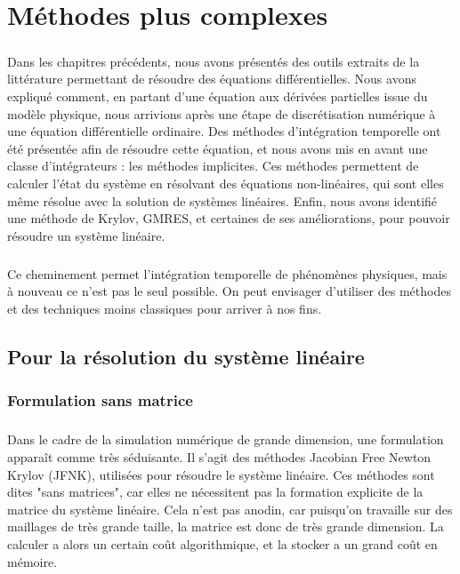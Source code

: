 \chapter{Méthodes plus complexes}

\paragraph{}
Dans les chapitres précédents, nous avons présentés des outils extraits de la littérature permettant de résoudre des équations différentielles.
Nous avons expliqué comment, en partant d'une équation aux dérivées partielles issue du modèle physique, nous arrivions après une étape de discrétisation numérique à une équation différentielle ordinaire.
Des méthodes d'intégration temporelle ont été présentée afin de résoudre cette équation, et nous avons mis en avant une classe d'intégrateurs : les méthodes implicites.
Ces méthodes permettent de calculer l'état du système en résolvant des équations non-linéaires, qui sont elles même résolue avec la solution de systèmes linéaires.
Enfin, nous avons identifié une méthode de Krylov, GMRES, et certaines de ses améliorations, pour pouvoir résoudre un système linéaire.

\paragraph{}
Ce cheminement permet l'intégration temporelle de phénomènes physiques, mais à nouveau ce n'est pas le seul possible.
On peut envisager d'utiliser des méthodes et des techniques moins classiques pour arriver à nos fins.


\section{Pour la résolution du système linéaire}


  \subsection{Formulation sans matrice}

    \paragraph{}
    Dans le cadre de la simulation numérique de grande dimension, une formulation apparaît comme très séduisante.
    Il s'agit des méthodes Jacobian Free Newton Krylov (JFNK), utilisées pour résoudre le système linéaire.
    Ces méthodes sont dites "sans matrices", car elles ne nécessitent pas la formation explicite de la matrice du système linéaire.
    Cela n'est pas anodin, car puisqu'on travaille sur des maillages de très grande taille, la matrice est donc de très grande dimension.
    La calculer a alors un certain coût algorithmique, et la stocker a un grand coût en mémoire.

